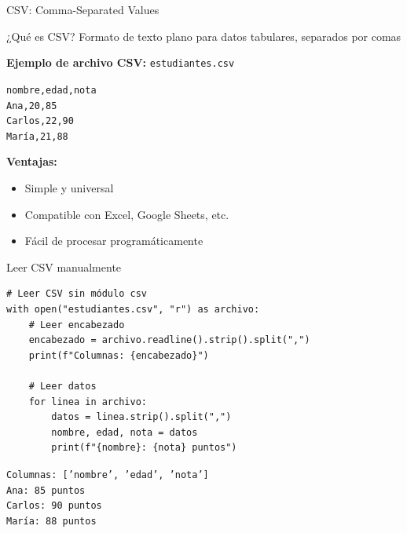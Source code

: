 \documentclass{beamer}
\begin{document}
\begin{frame}[fragile]{CSV: Comma-Separated Values \faTable}
\begin{conceptbox}{¿Qué es CSV?}
Formato de texto plano para datos tabulares, separados por comas
\end{conceptbox}

\textbf{Ejemplo de archivo CSV:} \texttt{estudiantes.csv}
\begin{tcolorbox}[colback=bg1,colframe=brown,left=3pt,right=3pt,top=2pt,bottom=2pt]
\small\texttt{nombre,edad,nota\\
Ana,20,85\\
Carlos,22,90\\
María,21,88}
\end{tcolorbox}

\vspace{0.2cm}
\textbf{Ventajas:}
\small
\begin{itemize}
    \item[\faCheck] Simple y universal
    \item[\faCheck] Compatible con Excel, Google Sheets, etc.
    \item[\faCheck] Fácil de procesar programáticamente
\end{itemize}
\end{frame}

\begin{frame}[fragile]{Leer CSV manualmente \faFileAlt}
\begin{lstlisting}
# Leer CSV sin módulo csv
with open("estudiantes.csv", "r") as archivo:
    # Leer encabezado
    encabezado = archivo.readline().strip().split(",")
    print(f"Columnas: {encabezado}")
    
    # Leer datos
    for linea in archivo:
        datos = linea.strip().split(",")
        nombre, edad, nota = datos
        print(f"{nombre}: {nota} puntos")
\end{lstlisting}

\vspace{-0.2cm}
\begin{tcolorbox}[colback=green!10,colframe=green,title={\small\faArrowCircleRight \ Salida},coltitle=fg0,left=3pt,right=3pt,top=2pt,bottom=2pt,boxsep=1pt]
\small\texttt{Columnas: ['nombre', 'edad', 'nota']\\
Ana: 85 puntos\\
Carlos: 90 puntos\\
María: 88 puntos}
\end{tcolorbox}
\end{frame}
\end{document}
